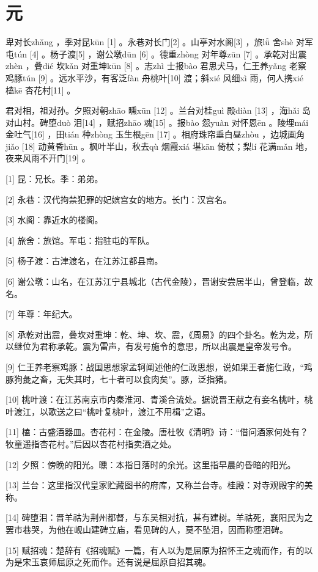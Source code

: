 \documentclass[12pt,UTF8]{ctexbook}
\begin{document}
\chapter{元}


卑对长zhǎng ，季对昆kūn [1] 。永巷对长门[2] 。山亭对水阁[3] ，旅lǚ 舍shè 对军屯tún [4] 。杨子渡[5] ，谢公墩dūn [6] 。德重zhòng 对年尊zūn [7] 。承乾对出震zhèn ，叠dié 坎kǎn 对重坤kūn [8] 。志zhì 士报bào 君思犬马，仁王养yǎng 老察鸡豚tún [9] 。远水平沙，有客泛fàn 舟桃叶[10] 渡；斜xié 风细xì 雨，何人携xié 榼kē 杏花村[11] 。

君对相，祖对孙。夕照对朝zhāo 曛xūn [12] 。兰台对桂guì 殿diàn [13] ，海hǎi 岛对山村。碑堕duò 泪[14] ，赋招zhāo 魂[15] 。报bào 怨yuàn 对怀恩ēn 。陵埋mái 金吐气[16] ，田tián 种zhòng 玉生根gēn [17] 。相府珠帘垂白昼zhòu ，边城画角jiǎo [18] 动黄昏hūn 。枫叶半山，秋去qù 烟霞xiá 堪kān 倚杖；梨lí 花满mǎn 地，夜来风雨不开门[19] 。


[1] 昆：兄长。季：弟弟。

[2] 永巷：汉代拘禁犯罪的妃嫔宫女的地方。长门：汉宫名。

[3] 水阁：靠近水的楼阁。

[4] 旅舍：旅馆。军屯：指驻屯的军队。

[5] 杨子渡：古津渡名，在江苏江都县南。

[6] 谢公墩：山名，在江苏江宁县城北（古代金陵），晋谢安尝居半山，曾登临，故名。

[7] 年尊：年纪大。

[8] 承乾对出震，叠坎对重坤：乾、坤、坎、震，《周易》的四个卦名。乾为龙，所以继位为君称承乾。震为雷声，有发号施令的意思，所以出震是皇帝发号令。

[9] 仁王养老察鸡豚：战国思想家孟轲阐述他的仁政思想，说如果王者施仁政，“鸡豚狗彘之畜，无失其时，七十者可以食肉矣”。豚，泛指猪。

[10] 桃叶渡：在江苏南京市内秦淮河、青溪合流处。据说晋王献之有妾名桃叶，桃叶渡江，以歌送之曰“桃叶复桃叶，渡江不用楫”之语。

[11] 榼：古盛酒器皿。杏花村：在金陵。唐杜牧《清明》诗：“借问酒家何处有？牧童遥指杏花村。”后因以杏花村指卖酒之处。

[12] 夕照：傍晚的阳光。曛：本指日落时的余光。这里指早晨的昏暗的阳光。

[13] 兰台：这里指汉代皇家贮藏图书的府库，又称兰台寺。桂殿：对寺观殿宇的美称。

[14] 碑堕泪：晋羊祜为荆州都督，与东吴相对抗，甚有建树。羊祜死，襄阳民为之罢巿巷哭，为他在岘山建碑立庙，看见碑的人，莫不坠泪，因而称堕泪碑。

[15] 赋招魂：楚辞有《招魂赋》一篇，有人以为是屈原为招怀王之魂而作，有的以为是宋玉哀师屈原之死而作。还有说是屈原自招其魂。
\end{document}
